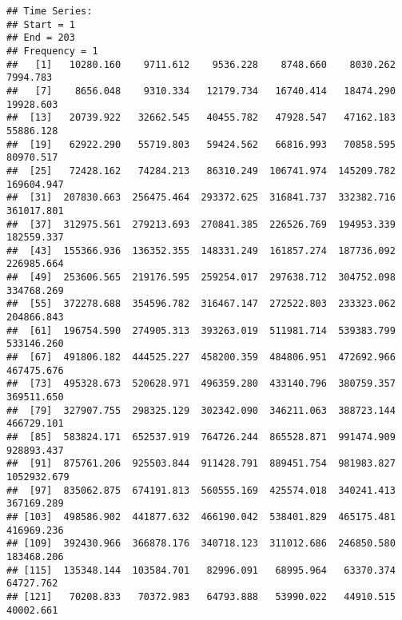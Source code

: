 \documentclass[
]{article}
\newenvironment{Shaded}{\begin{snugshade}}{\end{snugshade}}
\newcommand{\AttributeTok}[1]{\textcolor[rgb]{0.13,0.29,0.53}{#1}}
\newcommand{\CommentTok}[1]{\textcolor[rgb]{0.56,0.35,0.01}{\textit{#1}}}
\newcommand{\FloatTok}[1]{\textcolor[rgb]{0.00,0.00,0.81}{#1}}
\newcommand{\FunctionTok}[1]{\textcolor[rgb]{0.13,0.29,0.53}{\textbf{#1}}}
\newcommand{\NormalTok}[1]{#1}
\newcommand{\SpecialCharTok}[1]{\textcolor[rgb]{0.81,0.36,0.00}{\textbf{#1}}}
\newcommand{\StringTok}[1]{\textcolor[rgb]{0.31,0.60,0.02}{#1}}
\begin{document}
\begin{Shaded}
\end{Shaded}

\begin{verbatim}
## Time Series:
## Start = 1 
## End = 203 
## Frequency = 1 
##   [1]   10280.160    9711.612    9536.228    8748.660    8030.262    7994.783
##   [7]    8656.048    9310.334   12179.734   16740.414   18474.290   19928.603
##  [13]   20739.922   32662.545   40455.782   47928.547   47162.183   55886.128
##  [19]   62922.290   55719.803   59424.562   66816.993   70858.595   80970.517
##  [25]   72428.162   74284.213   86310.249  106741.974  145209.782  169604.947
##  [31]  207830.663  256475.464  293372.625  316841.737  332382.716  361017.801
##  [37]  312975.561  279213.693  270841.385  226526.769  194953.339  182559.337
##  [43]  155366.936  136352.355  148331.249  161857.274  187736.092  226985.664
##  [49]  253606.565  219176.595  259254.017  297638.712  304752.098  334768.269
##  [55]  372278.688  354596.782  316467.147  272522.803  233323.062  204866.843
##  [61]  196754.590  274905.313  393263.019  511981.714  539383.799  533146.260
##  [67]  491806.182  444525.227  458200.359  484806.951  472692.966  467475.676
##  [73]  495328.673  520628.971  496359.280  433140.796  380759.357  369511.650
##  [79]  327907.755  298325.129  302342.090  346211.063  388723.144  466729.101
##  [85]  583824.171  652537.919  764726.244  865528.871  991474.909  928893.437
##  [91]  875761.206  925503.844  911428.791  889451.754  981983.827 1052932.679
##  [97]  835062.875  674191.813  560555.169  425574.018  340241.413  367169.289
## [103]  498586.902  441877.632  466190.042  538401.829  465175.481  416969.236
## [109]  392430.966  366878.176  340718.123  311012.686  246850.580  183468.206
## [115]  135348.144  103584.701   82996.091   68995.964   63370.374   64727.762
## [121]   70208.833   70372.983   64793.888   53990.022   44910.515   40002.661

\end{verbatim}
\end{document}
